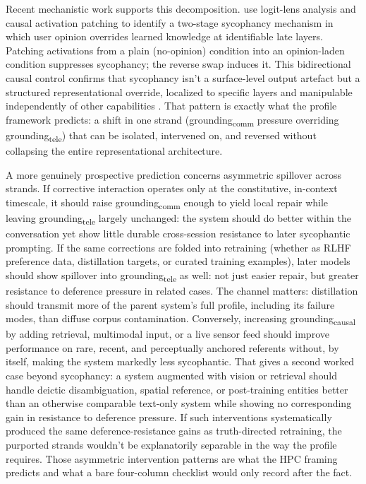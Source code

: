 \documentclass[12pt]{article}
\newcommand{\gtele}{grounding\textsubscript{tele}}
\newcommand{\gcausal}{grounding\textsubscript{causal}}
\newcommand{\gcomm}{grounding\textsubscript{comm}}
\begin{document}
Recent mechanistic work supports this decomposition. \textcite{wang_2025_truth_overridden_sycophancy} use logit-lens analysis and causal activation patching to identify a two-stage sycophancy mechanism in which user opinion overrides learned knowledge at identifiable late layers. Patching activations from a plain (no-opinion) condition into an opinion-laden condition suppresses sycophancy; the reverse swap induces it. This bidirectional causal control confirms that sycophancy isn't a surface-level output artefact but a structured representational override, localized to specific layers and manipulable independently of other capabilities \citep[see also][]{rimsky_2024_steering_sycophancy}. That pattern is exactly what the profile framework predicts: a shift in one strand (\gcomm{} pressure overriding \gtele{}) that can be isolated, intervened on, and reversed without collapsing the entire representational architecture.

A more genuinely prospective prediction concerns asymmetric spillover across strands. If corrective interaction operates only at the constitutive, in-context timescale, it should raise \gcomm{} enough to yield local repair while leaving \gtele{} largely unchanged: the system should do better within the conversation yet show little durable cross-session resistance to later sycophantic prompting. If the same corrections are folded into retraining (whether as RLHF preference data, distillation targets, or curated training examples), later models should show spillover into \gtele{} as well: not just easier repair, but greater resistance to deference pressure in related cases. The channel matters: distillation should transmit more of the parent system's full profile, including its failure modes, than diffuse corpus contamination. Conversely, increasing \gcausal{} by adding retrieval, multimodal input, or a live sensor feed should improve performance on rare, recent, and perceptually anchored referents without, by itself, making the system markedly less sycophantic. That gives a second worked case beyond sycophancy: a system augmented with vision or retrieval should handle deictic disambiguation, spatial reference, or post-training entities better than an otherwise comparable text-only system while showing no corresponding gain in resistance to deference pressure. If such interventions systematically produced the same deference-resistance gains as truth-directed retraining, the purported strands wouldn't be explanatorily separable in the way the profile requires. Those asymmetric intervention patterns are what the HPC framing predicts and what a bare four-column checklist would only record after the fact.
\end{document}
